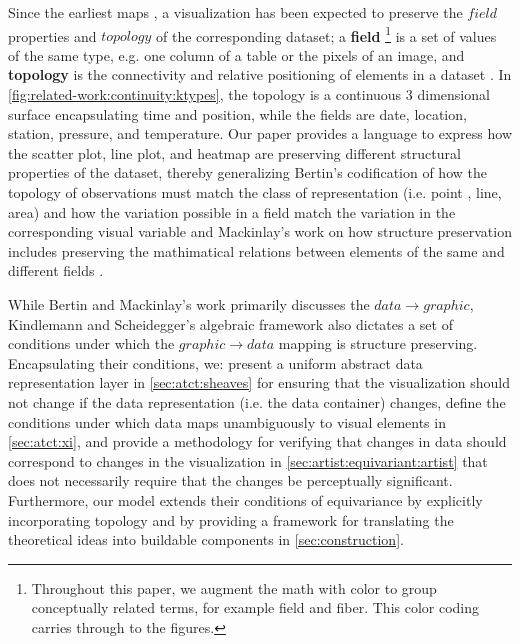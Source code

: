 \documentclass[journal]{IEEEtran}
\theoremstyle{definition}
\theoremstyle{remark}
\begin{document}
Since the earliest maps \cite{friendlyBriefHistoryData2006}, a visualization has been expected to preserve the $field$ properties and $topology$ of the corresponding dataset; a \textcolor{fiber}{\textbf{field}} \footnote{Throughout this paper, we augment the math with color to group conceptually related terms\cite{headMathAugmentationHow2022}, for example \textcolor{fiber}{field} and \textcolor{fiber}{fiber}. This color coding carries through to the figures.}  is a set of values of the same type, e.g. one column of a table or the pixels of an image, and \textcolor{base}{\textbf{topology}} is the connectivity and relative positioning of elements in a dataset \cite{wilkinsonGrammarGraphics2005}. In \autoref{fig:related-work:continuity:ktypes}, the topology is a continuous 3 dimensional surface encapsulating time and position, while the fields are date, location, station, pressure, and temperature. Our paper provides a language to express how the scatter plot, line plot, and heatmap are preserving different structural properties of the dataset, thereby generalizing Bertin's codification of how the topology of observations must match the class of representation (i.e. point , line, area) and how the variation possible in a field match the variation in the corresponding visual variable \cite{bertinSemiologyGraphicsDiagrams2011} and Mackinlay's work on how structure preservation includes preserving the mathimatical relations between elements of the same and different fields \cite{mackinlayAutomatingDesignGraphical1986}. 

While Bertin and Mackinlay's work primarily discusses the $data \rightarrow graphic$, Kindlemann and Scheidegger's algebraic framework \cite{kindlmannAlgebraicProcessVisualization2014} also dictates a set of conditions under which the $graphic \rightarrow data$  mapping is structure preserving. Encapsulating their conditions, we: present a uniform abstract data representation layer in \autoref{sec:atct:sheaves} for ensuring that the visualization should not change if the data representation (i.e. the data container) changes, define the conditions under which data maps unambiguously to visual elements \cite{ziemkiewiczEmbeddingInformationVisualization2009} in \autoref{sec:atct:xi}, and provide a methodology for verifying that changes in data should correspond to changes in the visualization in \autoref{sec:artist:equivariant:artist} that does not necessarily require that the changes be perceptually significant. Furthermore, our model extends their conditions of equivariance by explicitly incorporating topology and by providing a framework for translating the theoretical ideas into buildable components in \autoref{sec:construction}. 
\end{document}
